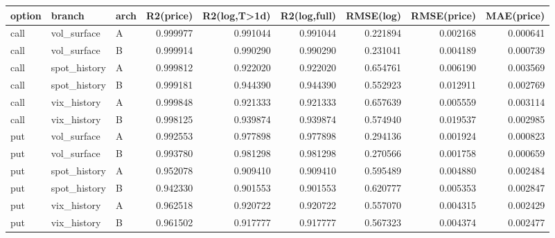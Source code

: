 \begin{tabular}{lllrrrrrr}
\toprule
option & branch & arch & R2(price) & R2(log,T>1d) & R2(log,full) & RMSE(log) & RMSE(price) & MAE(price) \\
\midrule
call & vol_surface & A & 0.999977 & 0.991044 & 0.991044 & 0.221894 & 0.002168 & 0.000641 \\
call & vol_surface & B & 0.999914 & 0.990290 & 0.990290 & 0.231041 & 0.004189 & 0.000739 \\
call & spot_history & A & 0.999812 & 0.922020 & 0.922020 & 0.654761 & 0.006190 & 0.003569 \\
call & spot_history & B & 0.999181 & 0.944390 & 0.944390 & 0.552923 & 0.012911 & 0.002769 \\
call & vix_history & A & 0.999848 & 0.921333 & 0.921333 & 0.657639 & 0.005559 & 0.003114 \\
call & vix_history & B & 0.998125 & 0.939874 & 0.939874 & 0.574940 & 0.019537 & 0.002985 \\
put & vol_surface & A & 0.992553 & 0.977898 & 0.977898 & 0.294136 & 0.001924 & 0.000823 \\
put & vol_surface & B & 0.993780 & 0.981298 & 0.981298 & 0.270566 & 0.001758 & 0.000659 \\
put & spot_history & A & 0.952078 & 0.909410 & 0.909410 & 0.595489 & 0.004880 & 0.002484 \\
put & spot_history & B & 0.942330 & 0.901553 & 0.901553 & 0.620777 & 0.005353 & 0.002847 \\
put & vix_history & A & 0.962518 & 0.920722 & 0.920722 & 0.557070 & 0.004315 & 0.002429 \\
put & vix_history & B & 0.961502 & 0.917777 & 0.917777 & 0.567323 & 0.004374 & 0.002477 \\
\bottomrule
\end{tabular}

